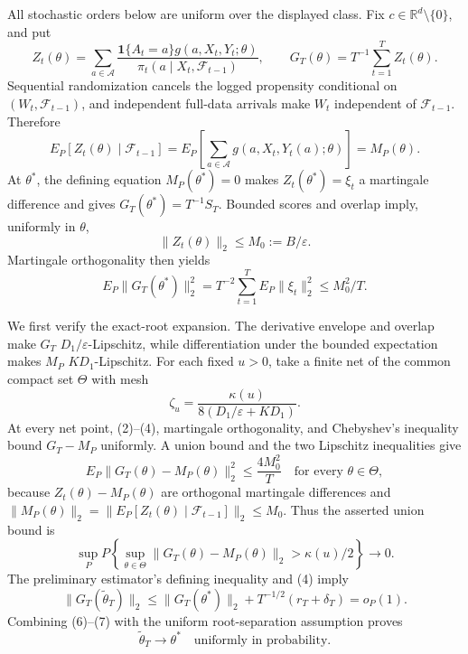 All stochastic orders below are uniform over the displayed class. Fix \(c\in\mathbb R^d\setminus\{0\}\), and put
\[
 Z_t(\theta)=\sum_{a\in\mathcal A}
 \frac{\mathbf1\{A_t=a\}g(a,X_t,Y_t;\theta)}
 {\pi_t(a\mid X_t,\mathcal F_{t-1})},
 \qquad G_T(\theta)=T^{-1}\sum_{t=1}^TZ_t(\theta).
\tag{1}
\]
Sequential randomization cancels the logged propensity conditional on \((W_t,\mathcal F_{t-1})\), and independent full-data arrivals make \(W_t\) independent of \(\mathcal F_{t-1}\). Therefore
\[
 E_P[Z_t(\theta)\mid\mathcal F_{t-1}]
 =E_P\!\left[\sum_{a\in\mathcal A}g(a,X_t,Y_t(a);\theta)\right]
 =M_P(\theta).
\tag{2}
\]
At \(\theta^*\), the defining equation \(M_P(\theta^*)=0\) makes \(Z_t(\theta^*)=\xi_t\) a martingale difference and gives \(G_T(\theta^*)=T^{-1}S_T\). Bounded scores and overlap imply, uniformly in \(\theta\),
\[
 \|Z_t(\theta)\|_2\le M_0:=B/\varepsilon.
\tag{3}
\]
Martingale orthogonality then yields
\[
 E_P\|G_T(\theta^*)\|_2^2
 =T^{-2}\sum_{t=1}^TE_P\|\xi_t\|_2^2
 \le M_0^2/T.
\tag{4}
\]

We first verify the exact-root expansion. The derivative envelope and overlap make \(G_T\) \(D_1/\varepsilon\)-Lipschitz, while differentiation under the bounded expectation makes \(M_P\) \(KD_1\)-Lipschitz. For each fixed \(u>0\), take a finite net of the common compact set \(\Theta\) with mesh
\[
 \zeta_u=\frac{\kappa(u)}{8(D_1/\varepsilon+KD_1)}.
\tag{5}
\]
At every net point, (2)--(4), martingale orthogonality, and Chebyshev's inequality bound \(G_T-M_P\) uniformly. A union bound and the two Lipschitz inequalities give
\[
 E_P\|G_T(\theta)-M_P(\theta)\|_2^2
 \le \frac{4M_0^2}{T}
 \quad\text{for every }\theta\in\Theta,
\tag{5a}
\]
because \(Z_t(\theta)-M_P(\theta)\) are orthogonal martingale differences and
\(\|M_P(\theta)\|_2=\|E_P[Z_t(\theta)\mid\mathcal F_{t-1}]\|_2\le M_0\).
Thus the asserted union bound is
\[
 \sup_P P\!\left\{\sup_{\theta\in\Theta}
 \|G_T(\theta)-M_P(\theta)\|_2>\kappa(u)/2\right\}\longrightarrow0.
\tag{6}
\]
The preliminary estimator's defining inequality and (4) imply
\[
 \|G_T(\widetilde\theta_T)\|_2
 \le\|G_T(\theta^*)\|_2+T^{-1/2}(r_T+\delta_T)=o_P(1).
\tag{7}
\]
Combining (6)--(7) with the uniform root-separation assumption proves
\[
 \widetilde\theta_T\longrightarrow\theta^*
 \quad\text{uniformly in probability}.
\tag{8}
\]

